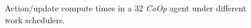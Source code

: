 \documentclass[
sigconf,natbib=false
,anonymous=true
,10pt
]{acmart}
\newcommand{\Coopfw}{\emph{CoOp}}
\begin{document}
\begin{figure}
	\caption{Action/update compute times in a \SI{32}{\bit} \Coopfw{} agent under different work schedulers.\label{fig:work-alloc-32}}
\end{figure}


\end{document}

